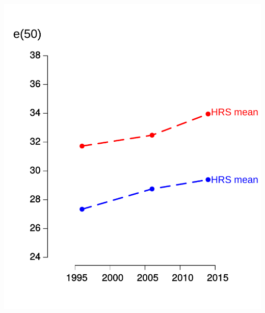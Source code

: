 \documentclass[20pt,usenames,dvipsnames]{beamer}
\begin{document}
\begin{frame}[plain]
\vspace{-1em}
\begin{center}
\includegraphics[height=20cm, keepaspectratio]{Figures/e50_3.pdf}
\end{center}
\end{frame}
\end{document}

